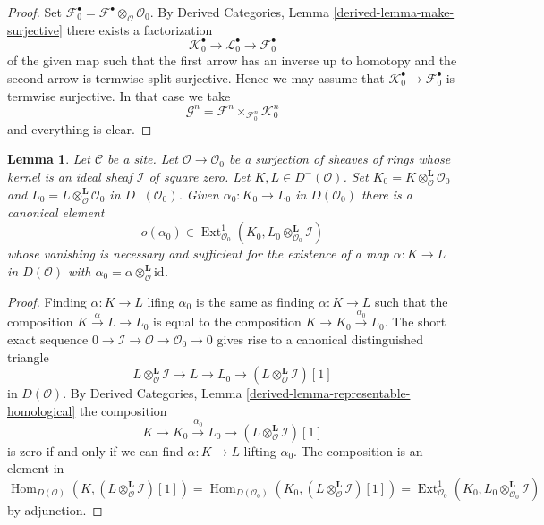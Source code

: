 \documentclass{stacks-project}
\theoremstyle{plain}
\newtheorem{lemma}[subsection]{Lemma}
\theoremstyle{definition}
\theoremstyle{remark}
\numberwithin{equation}{subsection}
\def\Hom{\mathop{\mathrm{Hom}}\nolimits}
\def\Ext{\mathop{\mathrm{Ext}}\nolimits}
\begin{document}
\begin{proof}
Set $\mathcal{F}_0^\bullet =
\mathcal{F}^\bullet \otimes_\mathcal{O} \mathcal{O}_0$.
By Derived Categories, Lemma \ref{derived-lemma-make-surjective}
there exists a factorization
$$
\mathcal{K}_0^\bullet \to \mathcal{L}_0^\bullet \to \mathcal{F}_0^\bullet
$$
of the given map such that the first arrow has an inverse up
to homotopy and the second arrow is termwise split surjective.
Hence we may assume that $\mathcal{K}_0^\bullet \to \mathcal{F}_0^\bullet$
is termwise surjective.
In that case we take
$$
\mathcal{G}^n = \mathcal{F}^n \times_{\mathcal{F}^n_0} \mathcal{K}_0^n
$$
and everything is clear.
\end{proof}

\begin{lemma}
\label{lemma-inf-obs-map-defo-complex}
Let $\mathcal{C}$ be a site. Let $\mathcal{O} \to \mathcal{O}_0$
be a surjection of sheaves of rings whose kernel is an ideal sheaf
$\mathcal{I}$ of square zero. Let $K, L \in D^-(\mathcal{O})$.
Set $K_0 = K \otimes_\mathcal{O}^\mathbf{L} \mathcal{O}_0$
and $L_0 = L \otimes_\mathcal{O}^\mathbf{L} \mathcal{O}_0$
in $D^-(\mathcal{O}_0)$. Given $\alpha_0 : K_0 \to L_0$ in $D(\mathcal{O}_0)$
there is a canonical element
$$
o(\alpha_0) \in \Ext^1_{\mathcal{O}_0}(K_0,
L_0 \otimes_{\mathcal{O}_0}^\mathbf{L} \mathcal{I})
$$
whose vanishing is necessary and sufficient for the
existence of a map $\alpha : K \to L$ in $D(\mathcal{O})$
with $\alpha_0 = \alpha \otimes_\mathcal{O}^\mathbf{L} \text{id}$.
\end{lemma}

\begin{proof}
Finding $\alpha : K \to L$ lifing $\alpha_0$ is the same as finding
$\alpha : K \to L$ such that the composition $K \xrightarrow{\alpha} L \to L_0$
is equal to the composition $K \to K_0 \xrightarrow{\alpha_0} L_0$.
The short exact sequence
$0 \to \mathcal{I} \to \mathcal{O} \to \mathcal{O}_0 \to 0$
gives rise to a canonical distinguished triangle
$$
L \otimes_\mathcal{O}^\mathbf{L} \mathcal{I} \to
L \to
L_0 \to
(L \otimes_\mathcal{O}^\mathbf{L} \mathcal{I})[1]
$$
in $D(\mathcal{O})$.
By Derived Categories, Lemma \ref{derived-lemma-representable-homological}
the composition
$$
K \to K_0 \xrightarrow{\alpha_0} L_0 \to
(L \otimes_\mathcal{O}^\mathbf{L} \mathcal{I})[1]
$$
is zero if and only if we can find $\alpha : K \to L$
lifting $\alpha_0$. The composition is an element in
$$
\Hom_{D(\mathcal{O})}(K, (L \otimes_\mathcal{O}^\mathbf{L} \mathcal{I})[1]) =
\Hom_{D(\mathcal{O}_0)}(K_0,
(L \otimes_\mathcal{O}^\mathbf{L} \mathcal{I})[1]) =
\Ext^1_{\mathcal{O}_0}(K_0,
L_0 \otimes_{\mathcal{O}_0}^\mathbf{L} \mathcal{I})
$$
by adjunction.
\end{proof}
\end{document}
